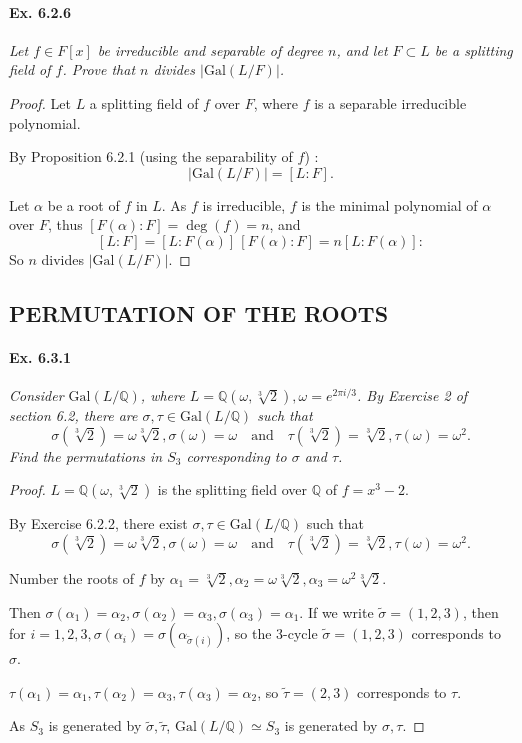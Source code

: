 \documentclass[11pt,a4paper]{article}
\newcommand{\Q}{\mathbb{Q}}
\newcommand{\Gal}{\mathrm{Gal}}
\begin{document}
\paragraph{Ex. 6.2.6}

{\it Let $f \in F[x]$ be irreducible and separable of degree $n$, and let $F\subset L$ be a splitting field of $f$. Prove that $n$ divides $\vert \Gal(L/F)\vert$.
}

\begin{proof}
Let $L$ a splitting field of  $f$ over $F$, where $f$ is a separable irreducible polynomial.


By Proposition 6.2.1 (using the separability of $f$) :
$$\vert \Gal(L/F) \vert =[L:F].$$

Let $\alpha$ be a root of  $f$ in  $L$. As $f$ is irreducible, $f$ is the minimal polynomial of $\alpha$ over $F$, thus $[F(\alpha) : F] = \deg(f) = n$, and
$$[L:F] = [L:F(\alpha)]\, [F(\alpha) : F] = n [L:F(\alpha)] :$$
So $n$ divides $\vert \Gal(L/F) \vert$.




\end{proof}

\subsection{PERMUTATION OF THE ROOTS}

\paragraph{Ex. 6.3.1}

{\it Consider $\Gal(L/\Q)$, where $L = \Q(\omega,\sqrt[3]{2}), \omega = e^{2 \pi i/3}$. By Exercise 2 of section 6.2, there are $\sigma, \tau \in \Gal(L/\Q)$ such that
$$\sigma(\sqrt[3]{2}) = \omega \sqrt[3]{2}, \sigma(\omega) = \omega \quad \mathrm{and} \quad \tau(\sqrt[3]{2}) = \sqrt[3]{2}, \tau (\omega) = \omega^2.$$
Find the permutations in $S_3$ corresponding to $\sigma$ and $\tau$.
}

\begin{proof}
 $L = \Q(\omega,\sqrt[3]{2})$ is the splitting field over $\Q$ of $f=x^3-2$.

By Exercise 6.2.2, there exist $\sigma,\tau \in \Gal(L/\Q)$ such that
$$\sigma(\sqrt[3]{2}) = \omega\sqrt[3]{2}, \sigma(\omega) = \omega \quad \mathrm{and} \quad \tau(\sqrt[3]{2}) = \sqrt[3]{2}, \tau(\omega) = \omega^2.$$

Number the roots of $f$ by $\alpha_1 = \sqrt[3]{2}, \alpha_2 = \omega\sqrt[3]{2}, \alpha_3 = \omega^2\sqrt[3]{2}$.

Then $\sigma(\alpha_1) = \alpha_2, \sigma(\alpha_2) =\alpha_3, \sigma(\alpha_3) = \alpha_1$. If we write $\tilde{\sigma} = (1,2,3)$, then for $i=1,2,3, \sigma(\alpha_i) = \sigma(\alpha_{\tilde{\sigma}(i)})$, so the 3-cycle $\tilde{\sigma} =(1,2,3)$ corresponds to $\sigma$.

$\tau(\alpha_1) = \alpha_1, \tau(\alpha_2) = \alpha_3, \tau(\alpha_3) = \alpha_2$, so $\tilde{\tau} = (2,3)$  corresponds to $\tau$.

As $S_3$ is generated by $\tilde{\sigma}, \tilde{\tau}$, $ \Gal(L/\Q) \simeq S_3$ is generated by $\sigma,\tau$.
\end{proof}
\end{document}
